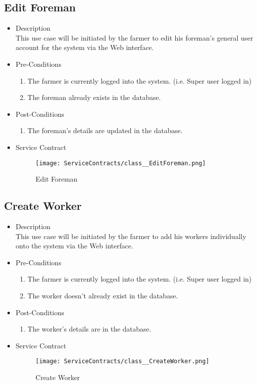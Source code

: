 \documentclass[11pt,fleqn]{book} %
\begin{document}
\subsection{Edit Foreman}
\begin{itemize}
	\item Description\\
	This use case will be initiated by the farmer to edit his foreman’s general user account for the system via the Web interface.
	\item Pre-Conditions
	\begin{enumerate}
		\item The farmer is currently logged into the system. (i.e. Super user logged in)
		\item The foreman already exists in the database.					
	\end{enumerate}
	\item Post-Conditions
	\begin{enumerate}
		\item The foreman’s details are updated in the database.
	\end{enumerate}
	\item Service Contract
	\begin{figure}
		\texttt{[image: ServiceContracts/class\_\_EditForeman.png]}
		\caption{Edit Foreman}
	\end{figure}
\end{itemize}

\subsection{Create Worker}
\begin{itemize}
	\item Description\\
	This use case will be initiated by the farmer to add his workers individually onto the system via the Web interface.
	\item Pre-Conditions
	\begin{enumerate}
		\item The farmer is currently logged into the system. (i.e. Super user logged in)
		\item The worker doesn’t already exist in the database.
	\end{enumerate}
	\item Post-Conditions
	\begin{enumerate}
		\item The worker’s details are in the database.			
	\end{enumerate}
	\item Service Contract
	\begin{figure}
		\texttt{[image: ServiceContracts/class\_\_CreateWorker.png]}
		\caption{Create Worker}
	\end{figure}
\end{itemize}
\end{document}
